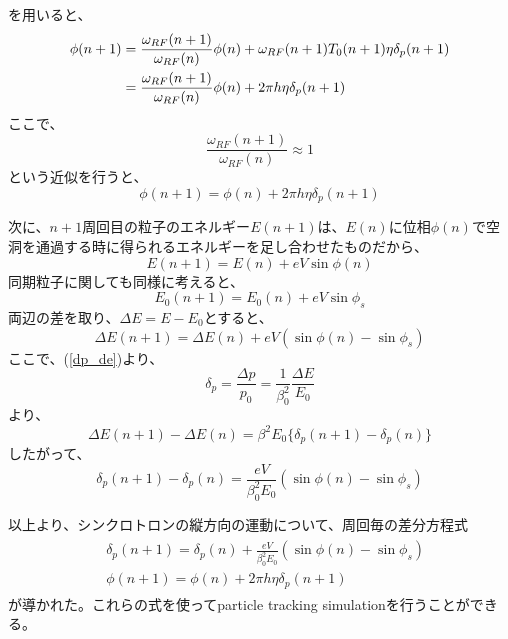 \documentclass[10pt,a4paper]{ltjsarticle}
\begin{document}
%
を用いると、
%
\begin{align}
  \phi(n+1) &= \frac{\omega_{RF}(n+1)}{\omega_{RF}(n)}\phi(n) + \omega_{RF}(n+1)T_0(n+1)\eta \delta_p(n+1) \notag \\
  &=\frac{\omega_{RF}(n+1)}{\omega_{RF}(n)}\phi(n) + 2\pi h \eta \delta_p(n+1)
\end{align}
%
ここで、
%
\begin{equation}
  \frac{\omega_{RF}(n+1)}{\omega_{RF}(n)} \approx 1
\end{equation}
%
という近似を行うと、
%
\begin{equation}
  \phi(n+1) = \phi(n) + 2\pi h \eta \delta_p(n+1)
\end{equation}

次に、$n+1$周回目の粒子のエネルギー$E(n+1)$は、$E(n)$に位相$\phi(n)$で空洞を通過する時に得られるエネルギーを足し合わせたものだから、
%
\begin{equation}
  E(n+1) = E(n) + e V \sin\phi (n)
\end{equation}
%
同期粒子に関しても同様に考えると、
%
\begin{equation}
  E_0(n+1) = E_0(n) + e V \sin\phi_s
\end{equation}
%
両辺の差を取り、$\Delta E = E - E_0$とすると、
%
\begin{equation}
  \Delta E(n+1) = \Delta E(n) + e V (\sin\phi(n) - \sin\phi_s)
\end{equation}
%
ここで、(\ref{dp_de})より、
%
\begin{equation}
  \delta_p = \frac{\Delta p}{p_0} = \frac{1}{\beta_0^2}\frac{\Delta E}{E_0}
  \label{delta_p}
\end{equation}
%
より、
%
\begin{equation}
  \Delta E(n+1) - \Delta E(n) = \beta^2 E_0 \{\delta_p(n+1) - \delta_p(n)\}
\end{equation}
%
したがって、
%
\begin{equation}
  \delta_p(n+1) - \delta_p(n) = \frac{e V}{\beta_0^2 E_0}(\sin\phi(n) -\sin\phi_s)
\end{equation}
%

以上より、シンクロトロンの縦方向の運動について、周回毎の差分方程式
%
\begin{align}
  \begin{split}
     &\delta_p(n+1) = \delta_p(n) + \frac{e V}{\beta_0^2 E_0}(\sin\phi(n) -\sin\phi_s) \\
     &\phi(n+1) = \phi(n) + 2\pi h \eta \delta_p(n+1)
    \label{map}
  \end{split}
\end{align}
%
が導かれた。これらの式を使ってparticle tracking simulationを行うことができる。
\end{document}
